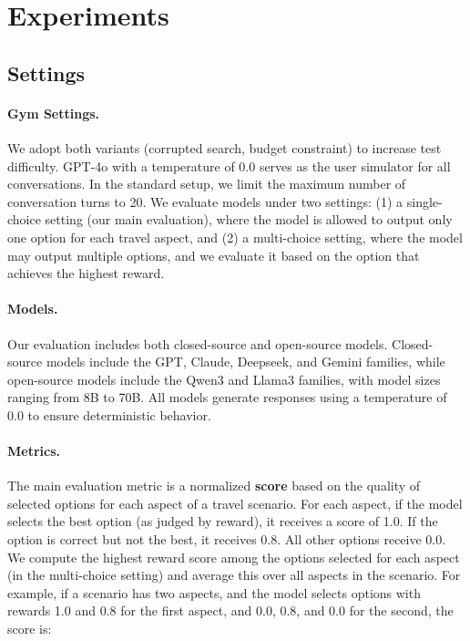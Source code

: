\section{Experiments}



\subsection{Settings}
\paragraph{Gym Settings.}
We adopt both variants (corrupted search, budget constraint) to increase test difficulty. GPT-4o with a temperature of 0.0 serves as the user simulator for all conversations. In the standard setup, we limit the maximum number of conversation turns to 20. We evaluate models under two settings: (1) a single-choice setting (our main evaluation), where the model is allowed to output only one option for each travel aspect, and (2) a multi-choice setting, where the model may output multiple options, and we evaluate it based on the option that achieves the highest reward.

\paragraph{Models.}
Our evaluation includes both closed-source and open-source models. Closed-source models include the GPT, Claude, Deepseek, and Gemini families, while open-source models include the Qwen3 and Llama3 families, with model sizes ranging from 8B to 70B. All models generate responses using a temperature of 0.0 to ensure deterministic behavior.

\paragraph{Metrics.}
\label{sec:metrics}
The main evaluation metric is a normalized \textbf{score} based on the quality of selected options for each aspect of a travel scenario. For each aspect, if the model selects the best option (as judged by reward), it receives a score of 1.0. If the option is correct but not the best, it receives 0.8. All other options receive 0.0. We compute the highest reward score among the options selected for each aspect (in the multi-choice setting) and average this over all aspects in the scenario. For example, if a scenario has two aspects, and the model selects options with rewards 1.0 and 0.8 for the first aspect, and 0.0, 0.8, and 0.0 for the second, the score is:

